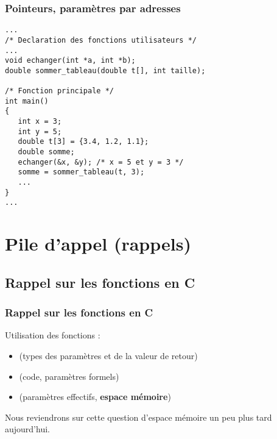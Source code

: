 \documentclass[xcolor=svgnames]{beamer}
\begin{document}
\begin{frame}[fragile]
  \frametitle{Pointeurs, paramètres par adresses}

\begin{lstlisting}[basicstyle=\ttfamily\scriptsize,escapechar={\%}] 
...
/* Declaration des fonctions utilisateurs */
...
void echanger(int *a, int *b);
double sommer_tableau(double t[], int taille);

/* Fonction principale */
int main()
{
   int x = 3;
   int y = 5;
   double t[3] = {3.4, 1.2, 1.1};
   double somme;
   echanger(&x, &y); /* x = 5 et y = 3 */
   somme = sommer_tableau(t, 3); 
   ...
}
...
\end{lstlisting}
\end{frame}


\section{Pile d'appel (rappels)}
\subsection{Rappel sur les fonctions en C}
\begin{frame}
  \frametitle{Rappel sur les fonctions en C\nowrite}
 Utilisation des fonctions :
  \begin{itemize}
    \item {} (types des paramètres et de la valeur de retour)
    \item {}  (code, paramètres formels)
    \item {} (paramètres effectifs, \textbf{espace mémoire})
  \end{itemize}
Nous reviendrons sur cette question d'espace mémoire un peu plus tard aujourd'hui.
\end{frame}
\end{document}
